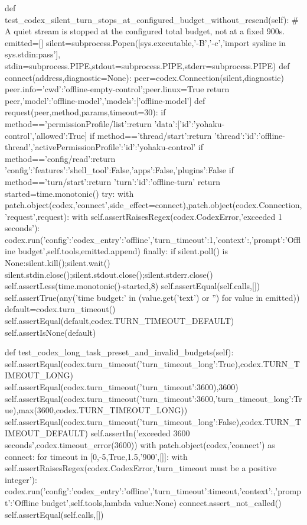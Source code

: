     def test_codex_silent_turn_stops_at_configured_budget_without_resend(self):
        # A quiet stream is stopped at the configured total budget, not at a fixed 900s.
        emitted=[]
        silent=subprocess.Popen([sys.executable,'-B','-c','import sys\nfor line in sys.stdin:pass\n'],
            stdin=subprocess.PIPE,stdout=subprocess.PIPE,stderr=subprocess.PIPE)
        def connect(address,diagnostic=None):
            peer=codex.Connection(silent,diagnostic)
            peer.info={'cwd':'offline-empty-control'};peer.linux=True
            return peer,{'model':'offline-model','models':['offline-model']}
        def request(peer,method,params,timeout=30):
            if method=='permissionProfile/list':return {'data':[{'id':'yohaku-control','allowed':True}]}
            if method=='thread/start':return {'thread':{'id':'offline-thread'},'activePermissionProfile':{'id':'yohaku-control'}}
            if method=='config/read':return {'config':{'features':{'shell_tool':False,'apps':False,'plugins':False}}}
            if method=='turn/start':return {'turn':{'id':'offline-turn'}}
            return {}
        started=time.monotonic()
        try:
            with patch.object(codex,'connect',side_effect=connect),patch.object(codex.Connection,'request',request):
                with self.assertRaisesRegex(codex.CodexError,'exceeded 1 seconds'):
                    codex.run({'config':{'codex_entry':'offline','turn_timeout':1},'context':{},'prompt':'Offline budget'},self.tools,emitted.append)
        finally:
            if silent.poll() is None:silent.kill();silent.wait()
            silent.stdin.close();silent.stdout.close();silent.stderr.close()
        self.assertLess(time.monotonic()-started,8)
        self.assertEqual(self.calls,[])
        self.assertTrue(any('time budget:' in (value.get('text') or '') for value in emitted))
        default=codex.turn_timeout({})
        self.assertEqual(default,codex.TURN_TIMEOUT_DEFAULT)
        self.assertIsNone(default)

    def test_codex_long_task_preset_and_invalid_budgets(self):
        self.assertEqual(codex.turn_timeout({'turn_timeout_long':True}),codex.TURN_TIMEOUT_LONG)
        self.assertEqual(codex.turn_timeout({'turn_timeout':3600}),3600)
        self.assertEqual(codex.turn_timeout({'turn_timeout':3600,'turn_timeout_long':True}),max(3600,codex.TURN_TIMEOUT_LONG))
        self.assertEqual(codex.turn_timeout({'turn_timeout_long':False}),codex.TURN_TIMEOUT_DEFAULT)
        self.assertIn('exceeded 3600 seconds',codex.timeout_error(3600))
        with patch.object(codex,'connect') as connect:
            for timeout in [0,-5,True,1.5,'900',[]]:
                with self.assertRaisesRegex(codex.CodexError,'turn_timeout must be a positive integer'):
                    codex.run({'config':{'codex_entry':'offline','turn_timeout':timeout},'context':{},'prompt':'Offline budget'},self.tools,lambda value:None)
            connect.assert_not_called()
        self.assertEqual(self.calls,[])

